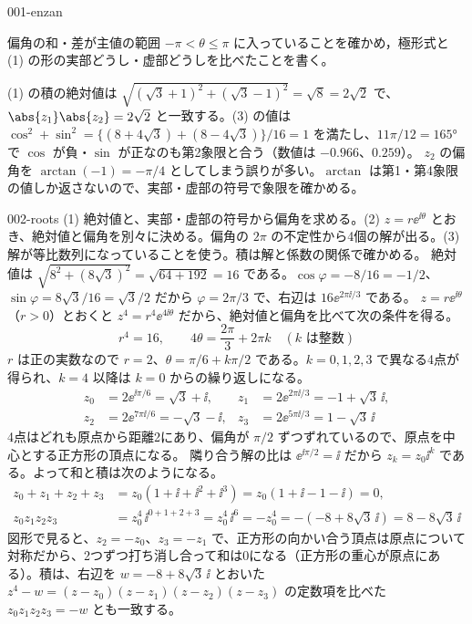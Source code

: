 \documentclass[uplatex,dvipdfmx,a4paper,11pt]{jsarticle}
\begin{document}
\begin{kaisetsu}{001-enzan}
\begin{ronten}
  \item {} 偏角の和・差が主値の範囲 $-\pi<\theta\le\pi$ に入っていることを確かめ，極形式と (1) の形の実部どうし・虚部どうしを比べたことを書く。
\end{ronten}
\kenzan (1) の積の絶対値は $\sqrt{(\sqrt{3}+1)^{2}+(\sqrt{3}-1)^{2}}=\sqrt{8}=2\sqrt{2}$ で、$\abs{z_{1}}\abs{z_{2}}=2\sqrt{2}$ と一致する。(3) の値は $\cos^{2}+\sin^{2}=\{(8+4\sqrt{3})+(8-4\sqrt{3})\}/16=1$ を満たし、$11\pi/12=\ang{165}$ で $\cos$ が負・$\sin$ が正なのも第2象限と合う（数値は $-0.966$、$0.259$）。
\tsumazuki $z_{2}$ の偏角を $\arctan(-1)=-\pi/4$ としてしまう誤りが多い。$\arctan$ は第1・第4象限の値しか返さないので、実部・虚部の符号で象限を確かめる。
\end{kaisetsu}

\begin{kaisetsu}{002-roots}
\houshin (1) 絶対値と、実部・虚部の符号から偏角を求める。(2) $z=r\ee^{\ii\theta}$ とおき、絶対値と偏角を別々に決める。偏角の $2\pi$ の不定性から4個の解が出る。(3) 解が等比数列になっていることを使う。積は解と係数の関係で確かめる。
\keisan {} 絶対値は $\sqrt{8^{2}+(8\sqrt{3})^{2}}=\sqrt{64+192}=16$ である。$\cos\varphi=-8/16=-1/2$、$\sin\varphi=8\sqrt{3}/16=\sqrt{3}/2$ だから $\varphi=2\pi/3$ で、右辺は $16\ee^{2\pi\ii/3}$ である。
 $z=r\ee^{\ii\theta}$（$r>0$）とおくと $z^{4}=r^{4}\ee^{4\ii\theta}$ だから、絶対値と偏角を比べて次の条件を得る。
\[ r^{4}=16,\qquad 4\theta=\frac{2\pi}{3}+2\pi k\quad(k\text{ は整数}) \]
$r$ は正の実数なので $r=2$、$\theta=\pi/6+k\pi/2$ である。$k=0,1,2,3$ で異なる4点が得られ、$k=4$ 以降は $k=0$ からの繰り返しになる。
\begin{align*}
  z_{0}&=2\ee^{\ii\pi/6}=\sqrt{3}+\ii, & z_{1}&=2\ee^{2\pi\ii/3}=-1+\sqrt{3}\,\ii,\\
  z_{2}&=2\ee^{7\pi\ii/6}=-\sqrt{3}-\ii, & z_{3}&=2\ee^{5\pi\ii/3}=1-\sqrt{3}\,\ii
\end{align*}
4点はどれも原点から距離2にあり、偏角が $\pi/2$ ずつずれているので、原点を中心とする正方形の頂点になる。
 隣り合う解の比は $\ee^{\ii\pi/2}=\ii$ だから $z_{k}=z_{0}\ii^{k}$ である。よって和と積は次のようになる。
\begin{align*}
  z_{0}+z_{1}+z_{2}+z_{3}&=z_{0}(1+\ii+\ii^{2}+\ii^{3})=z_{0}(1+\ii-1-\ii)=0,\\
  z_{0}z_{1}z_{2}z_{3}&=z_{0}^{4}\,\ii^{0+1+2+3}=z_{0}^{4}\,\ii^{6}=-z_{0}^{4}=-(-8+8\sqrt{3}\,\ii)=8-8\sqrt{3}\,\ii
\end{align*}
図形で見ると、$z_{2}=-z_{0}$、$z_{3}=-z_{1}$ で、正方形の向かい合う頂点は原点について対称だから、2つずつ打ち消し合って和は0になる（正方形の重心が原点にある）。積は、右辺を $w=-8+8\sqrt{3}\,\ii$ とおいた $z^{4}-w=(z-z_{0})(z-z_{1})(z-z_{2})(z-z_{3})$ の定数項を比べた $z_{0}z_{1}z_{2}z_{3}=-w$ とも一致する。

\end{kaisetsu}
\end{document}
